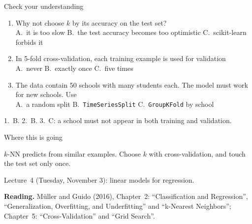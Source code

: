 \documentclass[handout,aspectratio=169,t,9pt]{beamer}
\begin{document}
\begin{frame}{Check your understanding}
  \begin{exercise}
    \begin{enumerate}[itemsep=3pt,topsep=3pt]
      \item Why not choose $k$ by its accuracy on the test set?\\
            A.~it is too slow \quad
            B.~the test accuracy becomes too optimistic \quad
            C.~scikit-learn forbids it
      \item In 5-fold cross-validation, each training example is used for
            validation\\
            A.~never \quad B.~exactly once \quad C.~five times
      \item The data contain 50 schools with many students each.  The model
            must work for new schools.  Use\\
            A.~a random split \quad B.~\texttt{TimeSeriesSplit} \quad
            C.~\texttt{GroupKFold} by school
    \end{enumerate}
  \end{exercise}

  \begin{solution}
    1.~B.  2.~B.  3.~C: a school must not appear in both training and
    validation.
  \end{solution}
\end{frame}

\begin{frame}{Where this is going}
  \vspace{0.3cm}
  \begin{takeaway}
    $k$-NN predicts from similar examples.  Choose $k$ with
    cross-validation, and touch the test set only once.
  \end{takeaway}

  \vfill
  \begin{comingup}
    Lecture~4 (Tuesday, November 3): linear models for regression.
  \end{comingup}

  \vfill
  \textbf{Reading.} M\"{u}ller and Guido (2016), Chapter~2: ``Classification
  and Regression'', ``Generalization, Overfitting, and Underfitting'' and
  ``k-Nearest Neighbors''; Chapter~5: ``Cross-Validation'' and
  ``Grid Search''.
\end{frame}
\end{document}
